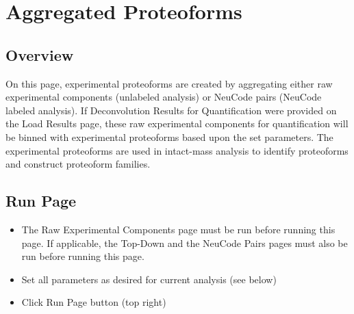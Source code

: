 
\section{Aggregated Proteoforms}

\subsection{Overview}

On this page, experimental proteoforms are created by aggregating either raw experimental components (unlabeled analysis) or NeuCode pairs (NeuCode labeled analysis). If Deconvolution Results for Quantification were provided on the Load Results page, these raw experimental components for quantification will be binned with experimental proteoforms based upon the set parameters. The experimental proteoforms are used in intact-mass analysis to identify proteoforms and construct proteoform families.

\subsection{Run Page}
\begin{itemize}
\item The Raw Experimental Components page must be run before running this page. If applicable, the Top-Down and the NeuCode Pairs pages must also be run before running this page.
\item Set all parameters as desired for current analysis (see below)
\item Click Run Page button (top right)
\end{itemize}

